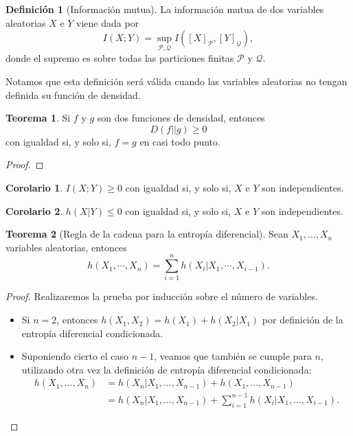 \documentclass[10pt,a4paper]{article} %
\theoremstyle{definition}
\newtheorem{definition}{Definición}[section]
\newtheorem{theorem}{Teorema}[section]
\newtheorem{corollary}{Corolario}[theorem]
\begin{document}
\begin{definition}[Información mutua]
  La información mutua de dos variables aleatorias $X$ e $Y$ viene dada por \[
I(X;Y) = \sup_{\mathcal{P},\mathcal{Q}}I\left ( [X]_{\mathcal{P}}, [Y]_{\mathcal{Q}} \right),
  \]donde el supremo es sobre todas las particiones finitas $\mathcal{P}$ y $\mathcal{Q}$.
\end{definition}
Notamos que esta definición será válida cuando las variables aleatorias no tengan definida su función de densidad.


\begin{theorem}Si $f$ y $g$ son dos funciones de densidad, entonces\[
D\left ( f || g \right ) \ge 0
\]
con igualdad si, y solo si, $f = g$ en casi todo punto.
\end{theorem}
\begin{proof}
\end{proof}

\begin{corollary}\label{c:im_indc}
$I(X;Y)\ge 0$ con igualdad si, y solo si, $X$ e $Y$ son independientes.
\end{corollary}

\begin{corollary}
$h(X|Y) \le 0$ con igualdad si, y solo si, $X$ e $Y$ son independientes.
\end{corollary}

\begin{theorem}[Regla de la cadena para la entropía diferencial] Sean $X_1,\dots, X_n$ variables aleatorias, entonces
  \[
h(X_1,\cdots,X_n) = \sum_{i=1}^n h(X_i|X_1,\cdots, X_{i-1}).
  \]
\end{theorem}

\begin{proof}
  Realizaremos la prueba por inducción sobre el número de variables.
  \begin{itemize}
  \item Si $n=2$, entonces $h(X_1,X_2) = h(X_1) + h(X_2|X_1)$ por definición de la entropía diferencial condicionada.
  \item Suponiendo cierto el caso $n-1$, veamos que también se cumple para $n$, utilizando otra vez la definición de entropía diferencial condicionada:
    \begin{align*}
h(X_1,\dots,X_n) &= h(X_n|X_1,\dots, X_{n-1}) + h(X_1,\dots, X_{n-1})\\ &= h(X_n|X_1,\dots,X_{n-1}) + \sum_{i=1}^{n-1}h(X_i|X_1,\dots,X_{i-1}).
    \end{align*}
  \end{itemize}
\end{proof}
\end{document}

